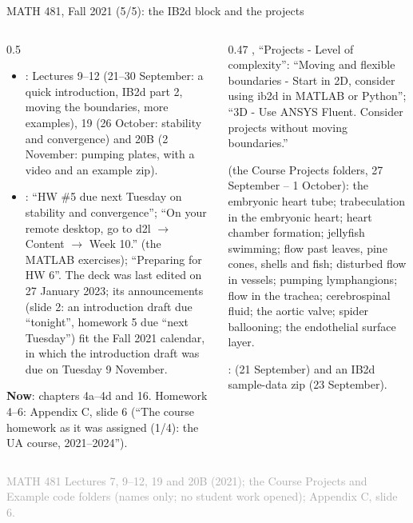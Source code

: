 \documentclass[aspectratio=169,11pt]{beamer}
\newcommand{\sourcecredit}[1]{\vfill\begin{flushright}\tiny\textcolor{DarkGray}{#1}\end{flushright}}
\begin{document}
\begin{frame}{MATH 481, Fall 2021 (5/5): the IB2d block and the projects}
\label{fr:m481c2}
\begin{columns}[T,onlytextwidth]
\begin{column}{0.5\textwidth}
\scriptsize
\begin{itemize}\setlength{\itemsep}{2pt}
  \item {}: Lectures 9--12 (21--30 September: a quick introduction, IB2d part 2, moving the boundaries, more examples), 19 (26 October: stability and convergence) and 20B (2 November: pumping plates, with a video and an example zip).
  \item {}: ``HW \#5 due next Tuesday on stability and convergence''; ``On your remote desktop, go to d2l $\to$ Content $\to$ Week 10.'' (the MATLAB exercises); ``Preparing for HW 6''. The deck was last edited on 27 January 2023; its announcements (slide 2: an introduction draft due ``tonight'', homework 5 due ``next Tuesday'') fit the Fall 2021 calendar, in which the introduction draft was due on Tuesday 9 November.
\end{itemize}
\begin{homebox}
\scriptsize \textbf{Now}: chapters 4a--4d and 16. Homework 4--6: Appendix C, slide 6 (``The course homework as it was assigned (1/4): the UA course, 2021--2024'').
\end{homebox}
\end{column}
\begin{column}{0.47\textwidth}
\scriptsize
{}, ``Projects - Level of complexity'': ``Moving and flexible boundaries - Start in 2D, consider using ib2d in MATLAB or Python''; ``3D - Use ANSYS Fluent. Consider projects without moving boundaries.''

\vspace{1.5mm}
 (the Course Projects folders, 27 September -- 1 October): the embryonic heart tube; trabeculation in the embryonic heart; heart chamber formation; jellyfish swimming; flow past leaves, pine cones, shells and fish; disturbed flow in vessels; pumping lymphangions; flow in the trachea; cerebrospinal fluid; the aortic valve; spider ballooning; the endothelial surface layer.

\vspace{1.5mm}
:  (21 September) and an IB2d sample-data zip (23 September).
\end{column}
\end{columns}
\sourcecredit{MATH 481 Lectures 7, 9--12, 19 and 20B (2021); the Course Projects and Example code folders (names only; no student work opened); Appendix C, slide 6.}
\end{frame}
\end{document}
